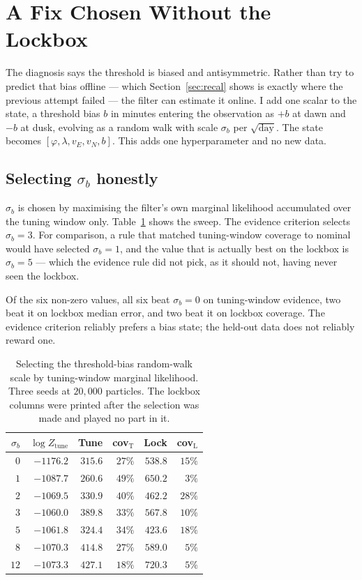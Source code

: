 \documentclass[conference]{IEEEtran}
\begin{document}
\section{A Fix Chosen Without the Lockbox}
\label{sec:fix}
The diagnosis says the threshold is biased and antisymmetric. Rather than try to
predict that bias offline --- which Section~\ref{sec:recal} shows is exactly
where the previous attempt failed --- the filter can estimate it online. I add
one scalar to the state, a threshold bias $b$ in minutes entering the
observation as $+b$ at dawn and $-b$ at dusk, evolving as a random walk with
scale $\sigma_b$ per $\sqrt{\text{day}}$. The state becomes
$[\varphi,\lambda,v_E,v_N,b]$. This adds one hyperparameter and no new data.

\subsection{Selecting $\sigma_b$ honestly}
$\sigma_b$ is chosen by maximising the filter's own marginal likelihood
accumulated over the tuning window only. Table~\ref{tab:sigb} shows the sweep.
The evidence criterion selects $\sigma_b=3$. For comparison, a rule that matched
tuning-window coverage to nominal would have selected $\sigma_b=1$, and the
value that is actually best on the lockbox is $\sigma_b=5$ --- which the
evidence rule did not pick, as it should not, having never seen the lockbox.

Of the six non-zero values, all six beat $\sigma_b=0$ on tuning-window evidence,
two beat it on lockbox median error, and two beat it on lockbox coverage. The
evidence criterion reliably prefers a bias state; the held-out data does not
reliably reward one.

\begin{table}[t]
\caption{Selecting the threshold-bias random-walk scale by tuning-window
marginal likelihood. Three seeds at $20{,}000$ particles. The lockbox columns
were printed after the selection was made and played no part in it.}
\label{tab:sigb}
\centering
\begin{tabular}{rrrrrr}
\toprule
$\sigma_b$ & $\log Z_\text{tune}$ & Tune & cov$_\text{T}$ & Lock & cov$_\text{L}$ \\
\midrule
$0$  & $-1176.2$ & $315.6$ & $27\%$ & $538.8$ & $15\%$ \\
$1$  & $-1087.7$ & $260.6$ & $49\%$ & $650.2$ & $3\%$ \\
$2$  & $-1069.5$ & $330.9$ & $40\%$ & $462.2$ & $28\%$ \\
$3$  & $\mathbf{-1060.0}$ & $389.8$ & $33\%$ & $567.8$ & $10\%$ \\
$5$  & $-1061.8$ & $324.4$ & $34\%$ & $423.6$ & $18\%$ \\
$8$  & $-1070.3$ & $414.8$ & $27\%$ & $589.0$ & $5\%$ \\
$12$ & $-1073.3$ & $427.1$ & $18\%$ & $720.3$ & $5\%$ \\
\bottomrule
\end{tabular}
\end{table}
\end{document}
